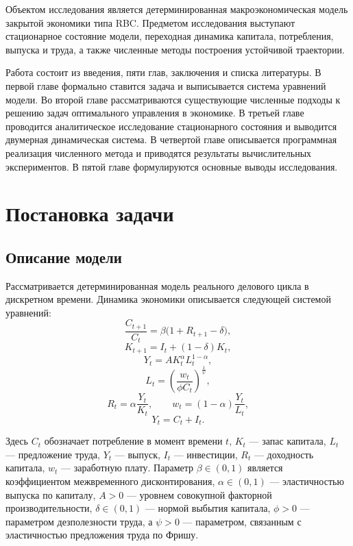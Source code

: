 \documentclass[14pt,a4paper]{extreport}
\begin{document}
Объектом исследования является детерминированная макроэкономическая модель закрытой экономики типа RBC. Предметом исследования выступают стационарное состояние модели, переходная динамика капитала, потребления, выпуска и труда, а также численные методы построения устойчивой траектории.

Работа состоит из введения, пяти глав, заключения и списка литературы. В первой главе формально ставится задача и выписывается система уравнений модели. Во второй главе рассматриваются существующие численные подходы к решению задач оптимального управления в экономике. В третьей главе проводится аналитическое исследование стационарного состояния и выводится двумерная динамическая система. В четвертой главе описывается программная реализация численного метода и приводятся результаты вычислительных экспериментов. В пятой главе формулируются основные выводы исследования.

\chapter{Постановка задачи}

    \section{Описание модели}

    Рассматривается детерминированная модель реального делового цикла в дискретном времени. Динамика экономики описывается следующей системой уравнений:
    \begin{equation}
    \frac{C_{t+1}}{C_t}=\beta\bigl(1+R_{t+1}-\delta\bigr),
    \end{equation}
    \begin{equation}
    K_{t+1}=I_t+(1-\delta)K_t,
    \end{equation}
    \begin{equation}
    Y_t=A K_t^{\alpha}L_t^{1-\alpha},
    \end{equation}
    \begin{equation}
    L_t=\left(\frac{w_t}{\phi C_t}\right)^{\frac{1}{\psi}},
    \end{equation}
    \begin{equation}
    R_t=\alpha\frac{Y_t}{K_t},
    \qquad
    w_t=(1-\alpha)\frac{Y_t}{L_t},
    \end{equation}
    \begin{equation}
    Y_t=C_t+I_t.
    \end{equation}

    Здесь $C_t$ обозначает потребление в момент времени $t$, $K_t$ --- запас капитала, $L_t$ --- предложение труда, $Y_t$ --- выпуск, $I_t$ --- инвестиции, $R_t$ --- доходность капитала, $w_t$ --- заработную плату. Параметр $\beta\in(0,1)$ является коэффициентом межвременного дисконтирования, $\alpha\in(0,1)$ --- эластичностью выпуска по капиталу, $A>0$ --- уровнем совокупной факторной производительности, $\delta\in(0,1)$ --- нормой выбытия капитала, $\phi>0$ --- параметром дезполезности труда, а $\psi>0$ --- параметром, связанным с эластичностью предложения труда по Фришу.
\end{document}
